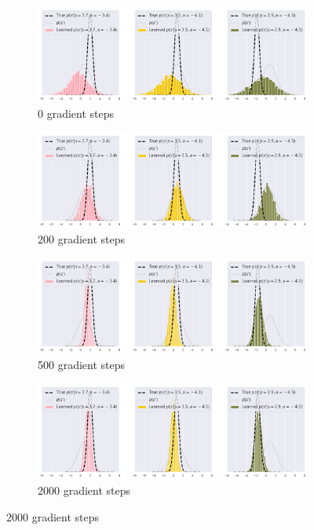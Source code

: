 \begin{figure}
\centering
\captionsetup{size=footnotesize}
\begin{subfigure}{\linewidth}
  \centering
  \includegraphics[width=1.0\linewidth]{img/trivariate/trivariate-epoch0}
  \caption{0 gradient steps}
  \label{fig_3_parameters_0}
\end{subfigure}
\begin{subfigure}{\textwidth}
  \centering
  \includegraphics[width=1.0\linewidth]{img/trivariate/trivariate-epoch200}
  \caption{200 gradient steps}
\end{subfigure}
\begin{subfigure}{\textwidth}
  \centering
  \includegraphics[width=1.0\linewidth]{img/trivariate/trivariate-epoch500.png}
  \caption{500 gradient steps}
\end{subfigure}
\begin{subfigure}{\textwidth}
  \centering
  \includegraphics[width=1.0\linewidth]{img/trivariate/trivariate-epoch2000}
  \caption{2000 gradient steps}
\end{subfigure}


\end{figure}
